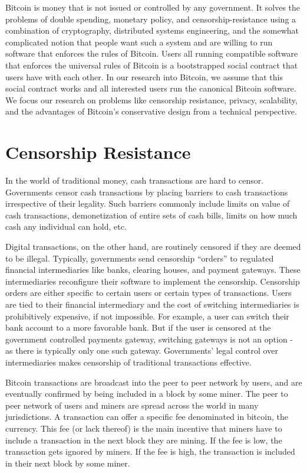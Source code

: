 Bitcoin is money that is not issued or controlled by any government. It solves the problems of double spending, monetary policy, and censorship-resistance using a combination of cryptography, distributed systems engineering, and the somewhat complicated notion that people want such a system and are willing to run software that enforces the rules of Bitcoin. Users all running compatible software that enforces the universal rules of Bitcoin is a bootstrapped social contract that users have with each other. In our research into Bitcoin, we assume that this social contract works and all interested users run the canonical Bitcoin software. We focus our research on problems like censorship resistance, privacy, scalability, and the advantages of Bitcoin's conservative design from a technical perspective.

\section{Censorship Resistance}
In the world of traditional money, cash transactions are hard to censor. Governments censor cash transactions by placing barriers to cash transactions irrespective of their legality. Such barriers commonly include limits on value of cash transactions, demonetization of entire sets of cash bills, limits on how much cash any individual can hold, etc. 

Digital transactions, on the other hand, are routinely censored if they are deemed to be illegal. Typically, governments send censorship ``orders'' to regulated financial intermediaries like banks, clearing houses, and payment gateways. These intermediaries reconfigure their software to implement the censorship. Censorship orders are either specific to certain users or certain types of transactions. Users are tied to their financial intermediary and the cost of switching intermediaries is prohibitively expensive, if not impossible. For example, a user can switch their bank account to a more favorable bank. But if the user is censored at the government controlled payments gateway, switching gateways is not an option - as there is typically only one such gateway. Governments' legal control over intermediaries makes censorship of traditional transactions effective.

Bitcoin transactions are broadcast into the peer to peer network by users, and are eventually confirmed by being included in a block by some miner. The peer to peer network of users and miners are spread across the world in many jurisdictions. A transaction can offer a specific fee denominated in bitcoin, the currency. This fee (or lack thereof) is the main incentive that miners have to include a transaction in the next block they are mining. If the fee is low, the transaction gets ignored by miners. If the fee is high, the transaction is included in their next block by some miner.

